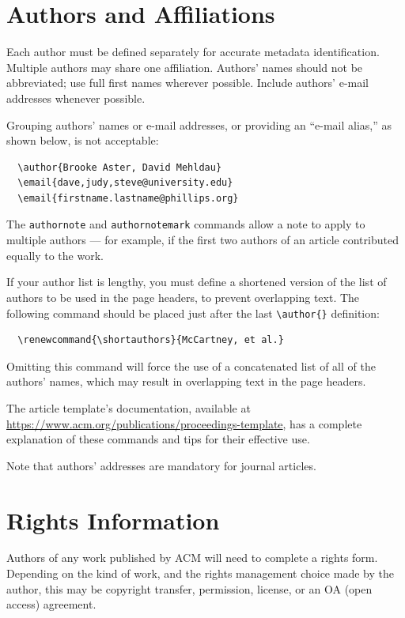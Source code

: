 \documentclass[sigconf,authordraft]{acmart}
\begin{document}
\section{Authors and Affiliations}

Each author must be defined separately for accurate metadata
identification. Multiple authors may share one affiliation. Authors'
names should not be abbreviated; use full first names wherever
possible. Include authors' e-mail addresses whenever possible.

Grouping authors' names or e-mail addresses, or providing an ``e-mail
alias,'' as shown below, is not acceptable:
\begin{verbatim}
  \author{Brooke Aster, David Mehldau}
  \email{dave,judy,steve@university.edu}
  \email{firstname.lastname@phillips.org}
\end{verbatim}

The \verb|authornote| and \verb|authornotemark| commands allow a note
to apply to multiple authors --- for example, if the first two authors
of an article contributed equally to the work.

If your author list is lengthy, you must define a shortened version of
the list of authors to be used in the page headers, to prevent
overlapping text. The following command should be placed just after
the last \verb|\author{}| definition:
\begin{verbatim}
  \renewcommand{\shortauthors}{McCartney, et al.}
\end{verbatim}
Omitting this command will force the use of a concatenated list of all
of the authors' names, which may result in overlapping text in the
page headers.

The article template's documentation, available at
\url{https://www.acm.org/publications/proceedings-template}, has a
complete explanation of these commands and tips for their effective
use.

Note that authors' addresses are mandatory for journal articles.

\section{Rights Information}

Authors of any work published by ACM will need to complete a rights
form. Depending on the kind of work, and the rights management choice
made by the author, this may be copyright transfer, permission,
license, or an OA (open access) agreement.
\end{document}
